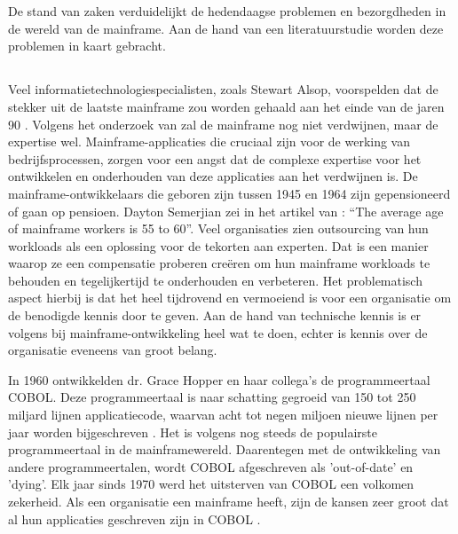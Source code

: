 \chapter{}
\label{ch:stand-van-zaken}



De stand van zaken verduidelijkt de hedendaagse problemen en bezorgdheden in de wereld van de mainframe. Aan de hand van een literatuurstudie worden deze problemen in kaart gebracht.

\section{}
\label{sec:Verdwijnen van expertise}

Veel informatietechnologiespecialisten, zoals Stewart Alsop, voorspelden dat de stekker uit de laatste mainframe zou worden gehaald aan het einde van de jaren 90 \autocite{McCracken2012}. Volgens het onderzoek van \textcite{Waites2013} zal de mainframe nog niet verdwijnen, maar de expertise wel. Mainframe-applicaties die cruciaal zijn voor de werking van bedrijfsprocessen, zorgen voor een angst dat de complexe expertise voor het ontwikkelen en onderhouden van deze applicaties aan het verdwijnen is. De mainframe-ontwikkelaars die geboren zijn tussen 1945 en 1964 zijn gepensioneerd of gaan op pensioen. Dayton Semerjian zei in het artikel van \textcite{Waites2013}: ``The average age of mainframe workers is 55 to 60''. Veel organisaties zien outsourcing van hun workloads als een oplossing voor de tekorten aan experten. Dat is een manier waarop ze een compensatie proberen creëren om hun mainframe workloads te behouden en tegelijkertijd te onderhouden en verbeteren. Het problematisch aspect hierbij is dat het heel tijdrovend en vermoeiend is voor een organisatie om de benodigde kennis door te geven. Aan de hand van technische kennis is er volgens \textcite{Waites2013} bij mainframe-ontwikkeling heel wat te doen, echter is kennis over de organisatie eveneens van groot belang.


In 1960 ontwikkelden dr. Grace Hopper en haar collega's de programmeertaal COBOL. Deze programmeertaal is naar schatting gegroeid van 150 tot 250 miljard lijnen applicatiecode, waarvan acht tot negen miljoen nieuwe lijnen per jaar worden bijgeschreven \autocite{Waites2013}. Het is volgens \textcite{Waites2013} nog steeds de populairste programmeertaal in de mainframewereld. Daarentegen met de ontwikkeling van andere programmeertalen, wordt COBOL afgeschreven als 'out-of-date' en 'dying'. Elk jaar sinds 1970 werd het uitsterven van COBOL een volkomen zekerheid. Als een organisatie een mainframe heeft, zijn de kansen zeer groot dat al hun applicaties geschreven zijn in COBOL \autocite{Waites2013}. 

